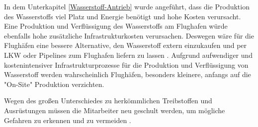 %
%

In dem Unterkapitel \ref{Wasserstoff-Antrieb} wurde angeführt, 
dass die Produktion des Wasserstoffs viel Platz und Energie benötigt und hohe Kosten verursacht. 
Eine Produktion und Verflüssigung des Wasserstoffs am Flughafen würde 
ebenfalls hohe zusätzliche Infrastrukturkosten \cite{dalmia2022powering} verursachen.
Deswegen wäre für die Flughäfen eine bessere Alternative, den Wasserstoff extern einzukaufen 
und per LKW oder Pipelines zum Flughafen liefern zu lassen \cite{gu2023hydrogen}.
Aufgrund aufwendiger und kostenintensiver Infrastrukturprozesse für die Produktion 
und Verflüssigung von Wasserstoff werden wahrscheinlich Flughäfen, 
besonders kleinere, anfangs auf die "On-Site" Produktion verzichten.

Wegen des großen Unterschiedes zu herkömmlichen Treibstoffen und 
Ausrüstungen müssen die Mitarbeiter neu geschult werden, 
um mögliche Gefahren zu erkennen und zu vermeiden \cite{gu2023hydrogen}.

